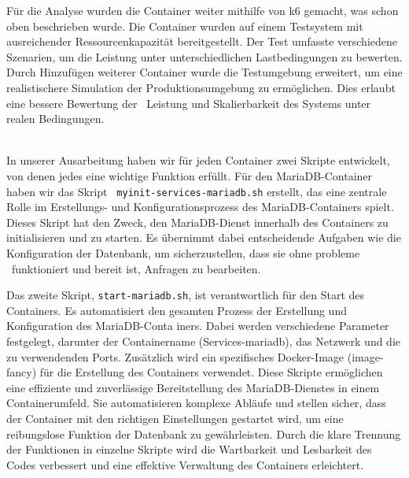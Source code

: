 {Für die Analyse wurden die Container weiter mithilfe von k6 gemacht, was schon oben beschrieben wurde. Die Container wurden auf einem Testsystem mit ausreichender Ressourcenkapazität
bereitgestellt. Der Test umfasste verschiedene Szenarien, um die Leistung unter unterschiedlichen Lastbedingungen zu bewerten.
Durch Hinzufügen weiterer Container wurde die Testumgebung erweitert, um eine realistischere Simulation der Produktionsumgebung zu ermöglichen. Dies erlaubt eine bessere Bewertung der
 Leistung und Skalierbarkeit des Systems unter realen Bedingungen.

\\

In unserer Ausarbeitung haben wir für jeden Container zwei Skripte entwickelt, von denen jedes eine wichtige Funktion erfüllt. Für den MariaDB-Container haben wir das Skript \texttt{
myinit-services-mariadb.sh} erstellt, das eine zentrale Rolle im Erstellungs- und Konfigurationsprozess des MariaDB-Containers spielt. Dieses Skript hat den Zweck, den MariaDB-Dienst
innerhalb des Containers zu initialisieren und zu starten. Es übernimmt dabei entscheidende Aufgaben wie die Konfiguration der Datenbank, um sicherzustellen, dass sie ohne probleme  funktioniert und bereit ist, Anfragen zu bearbeiten.

Das zweite Skript, \texttt{start-mariadb.sh}, ist verantwortlich für den Start des Containers. Es automatisiert den gesamten Prozess der Erstellung und Konfiguration des MariaDB-Conta
iners. Dabei werden verschiedene Parameter festgelegt, darunter der Containername (Services-mariadb), das Netzwerk und die zu verwendenden Ports. Zusätzlich wird ein spezifisches Docker-Image (image-fancy) für die Erstellung des Containers verwendet.
Diese Skripte ermöglichen eine effiziente und zuverlässige Bereitstellung des MariaDB-Dienstes in einem Containerumfeld. Sie automatisieren komplexe Abläufe und stellen sicher, dass der Container mit den richtigen Einstellungen gestartet wird, um eine reibungslose Funktion der Datenbank zu gewährleisten. Durch die klare Trennung der Funktionen in einzelne Skripte
wird die Wartbarkeit und Lesbarkeit des Codes verbessert und eine effektive Verwaltung des Containers erleichtert.

\\

}
